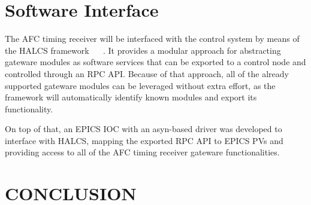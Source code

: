 \documentclass[a4paper,
               biblatex,      %
               ]{jacow}
\begin{document}
\section{Software Interface}
The AFC timing receiver will be interfaced with the control system by means of the HALCS framework ~\cite{halcs_pcapac16} ~\cite{halcs_icalepcs17}. It provides a modular approach for abstracting gateware modules as software services that can be exported to a control node and controlled through an RPC API. Because of that approach, all of the already supported gateware modules can be leveraged without extra effort, as the framework will automatically identify known modules and export its functionality.

On top of that, an EPICS IOC with an asyn-based driver was developed to interface with HALCS, mapping the exported RPC API to EPICS PVs and providing access to all of the AFC timing receiver gateware functionalities.

\section{CONCLUSION}


\printbibliography
\newpage
\end{document}
